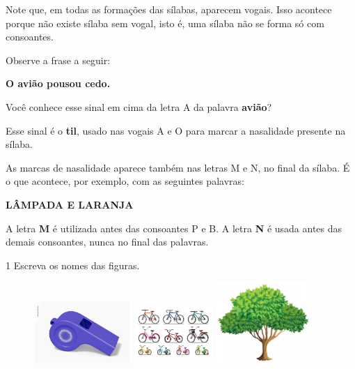 {Note que, em todas as formações das sílabas, aparecem vogais. Isso
acontece porque não existe sílaba sem vogal, isto é, uma  sílaba não
se forma só com consoantes.

Observe a frase a seguir:

\begin{myquote}
\textbf{O avião pousou cedo.}
\end{myquote}

Você conhece esse sinal em cima da letra A da palavra \textbf{avião}?

Esse sinal é o \textbf{til}, usado nas vogais A e O para marcar a
nasalidade presente na sílaba.

As marcas de nasalidade aparece também nas letras M e N, no final da
sílaba. É o que acontece, por exemplo, com as seguintes palavras:

\begin{myquote}
\textbf{LÂMPADA E LARANJA}
\end{myquote}

A letra \textbf{M} é utilizada antes das consoantes P e B.  
A letra \textbf{N} é usada antes das demais consoantes, nunca 
no final das palavras.
}


\num{1} Escreva os nomes das figuras.



\begin{figure}[htpb!]
\includegraphics[width=1.46154in,height=0.93603in]{media/image49.jpeg}
\includegraphics[width=1.16587in,height=0.93269in]{media/image50.jpeg}
\includegraphics[width=1.42308in,height=1.21950in]{media/image51.jpeg}
\end{figure}

